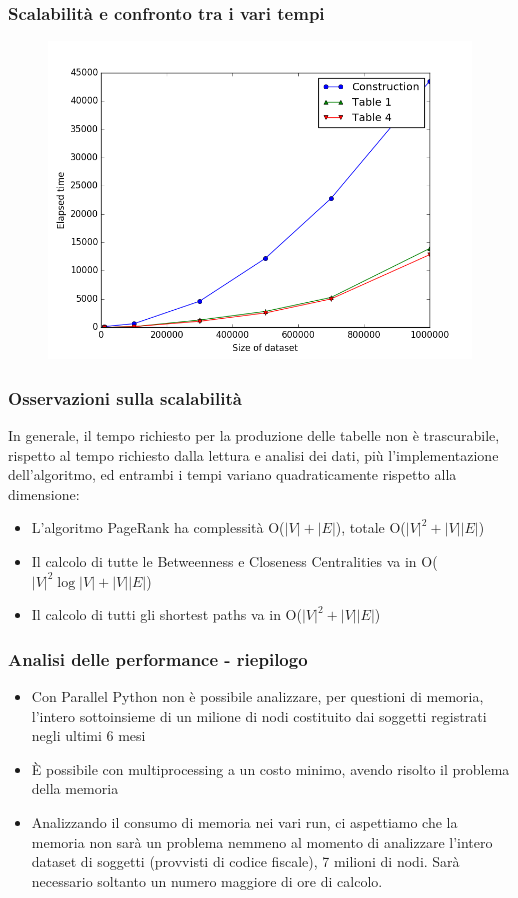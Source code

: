 \documentclass{beamer}
\begin{document}
\begin{frame}
 \frametitle{Scalabilità e confronto tra i vari tempi}

  \begin{figure}[htbp]
\centering
\includegraphics[height=6.0 cm,width=10 cm]{24cores_total.png}

\end{figure}
\end{frame}
\begin{frame}
\frametitle{Osservazioni sulla scalabilità}
In generale, il tempo richiesto per la produzione delle tabelle non è trascurabile, rispetto al tempo richiesto dalla lettura e analisi dei dati, più l'implementazione dell'algoritmo, ed entrambi i tempi variano quadraticamente rispetto alla dimensione:
\begin{itemize}
\item L'algoritmo PageRank ha complessità O($|V|+|E|$), totale O($|V|^2+|V||E|$)
\item Il calcolo di tutte le Betweenness e Closeness Centralities va in O($|V|^2\log|V|+|V||E|$)
\item Il calcolo di tutti gli shortest paths va in O($|V|^2+|V||E|$)
\end{itemize}

\end{frame}
\begin{frame}
\frametitle{Analisi delle performance - riepilogo}
\begin{itemize}
\item Con Parallel Python non è possibile analizzare, per questioni di memoria, l'intero sottoinsieme di un milione di nodi costituito dai soggetti registrati negli ultimi 6 mesi
\item È possibile con multiprocessing a un costo minimo, avendo risolto il problema della memoria
\item Analizzando il consumo di memoria nei vari run, ci aspettiamo che la memoria non sarà un problema nemmeno al momento di analizzare l'intero dataset di soggetti (provvisti di codice fiscale), 7 milioni di nodi. Sarà necessario soltanto un numero maggiore di ore di calcolo.
\end{itemize}

\end{frame}
\end{document}
